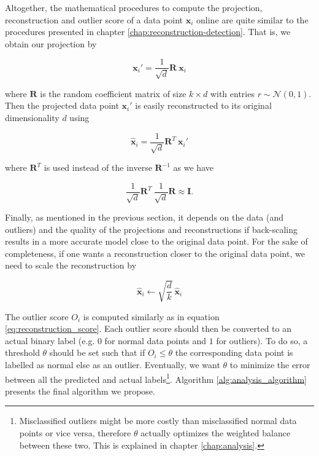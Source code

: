 Altogether, the mathematical procedures to compute the projection, reconstruction and outlier score of a data point $\mathbf{x}_i$ online are quite similar to the procedures presented in chapter \ref{chap:reconstruction-detection}. That is, we obtain our projection by

\vspace{-0.2cm}
\begin{equation}\label{eq:method_projection}
\mathbf{x}_i' = \frac{1}{\sqrt{d}} \mathbf{R} \ \mathbf{x}_i
\end{equation}

\noindent where $\mathbf{R}$ is the random coefficient matrix of size $k \times d$ with entries $r \sim \mathcal{N}(0,1)$. Then the projected data point $\mathbf{x}_i'$ is easily reconstructed to its original dimensionality $d$ using

\vspace{-0.1cm}
\begin{equation}\label{eq:method_reconstruction}
\hat{\mathbf{x}}_i = \frac{1}{\sqrt{d}} \mathbf{R}^T \ \mathbf{x}_i'
\end{equation}  

\noindent where $\mathbf{R}^T$ is used instead of the inverse $\mathbf{R}^{-1}$ as we have 

\vspace{-0.1cm}
\begin{equation}\label{eq:method_orthonormality}
\frac{1}{\sqrt{d}} \mathbf{R}^T \ \frac{1}{\sqrt{d}} \mathbf{R} \approx \mathbf{I}.
\end{equation}  

Finally, as mentioned in the previous section, it depends on the data (and outliers) and the quality of the projections and reconstructions if back-scaling results in a more accurate model close to the original data point. For the sake of completeness, if one wants a reconstruction closer to the original data point, we need to scale the reconstruction by

\vspace{-0.1cm}
\begin{equation}\label{eq:method_scaledreconstruction}
\hat{\mathbf{x}}_i \gets \sqrt{\frac{d}{k}} \ \hat{\mathbf{x}}_i
\end{equation} 

\noindent The outlier score $O_i$ is computed similarly as in equation \eqref{eq:reconstruction_score}. Each outlier score should then be converted to an actual binary label (e.g. $0$ for normal data points and $1$ for outliers). To do so, a threshold $\theta$ should be set such that if $O_i \leq \theta$ the corresponding data point is labelled as normal else as an outlier. Eventually, we want $\theta$ to minimize the error between all the predicted and actual labels\footnote{Misclassified outliers might be more costly than misclassified normal data points or vice versa, therefore $\theta$ actually optimizes the weighted balance between these two. This is explained in chapter \ref{chap:analysis}.}. Algorithm \ref{alg:analysis_algorithm} presents the final algorithm we propose.

